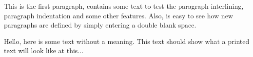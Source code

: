 \documentclass{article}
\begin{document}
This is the first paragraph, contains some text to test the paragraph
interlining, paragraph indentation and some other features. Also, is 
easy to see how new paragraphs are defined by simply entering a double 
blank space.

Hello,  here  is  some  text  without  a  meaning.   This  text  should
show what a printed text will look like at this... 
\end{document}
